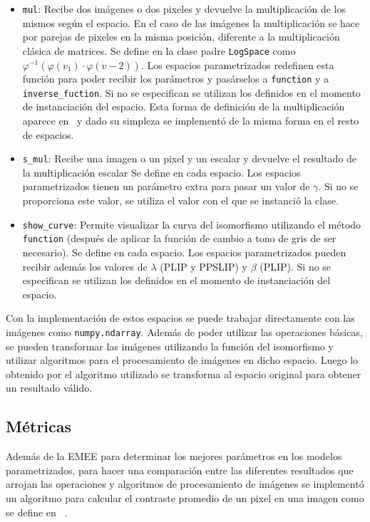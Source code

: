 \begin{itemize}
	\item \verb|mul|: Recibe dos im\'agenes o dos pixeles y devuelve la multiplicaci\'on de los mismos seg\'un el espacio. En el caso de las im\'agenes la multiplicaci\'on se hace por parejas de pixeles en la misma posici\'on, diferente a la multiplicaci\'on cl\'asica de matrices. Se define en la clase padre \verb|LogSpace| como $\varphi^{-1}(\varphi(v_1)\cdot\varphi(v-2))$. Los espacios parametrizados redefinen esta funci\'on para poder recibir los par\'ametros y pas\'arselos a \verb|function| y a \verb|inverse_fuction|. Si no se especifican se utilizan los definidos en el momento de instanciaci\'on del espacio. Esta forma de definici\'on de la multiplicaci\'on aparece en~\cite{panetta2010parameterized} y dado su simpleza se implement\'o de la misma forma en el resto de espacios.
	\item \verb|s_mul|: Recibe una imagen o un pixel y un escalar y devuelve el resultado de la multiplicaci\'on escalar Se define en cada espacio. Los espacios parametrizados tienen un par\'ametro extra para pasar un valor de $\gamma$. Si no se proporciona este valor, se utiliza el valor con el que se instanci\'o la clase.
	\item \verb|show_curve|: Permite visualizar la curva del isomorfismo utilizando el m\'etodo \verb|function| (despu\'es de aplicar la funci\'on de cambio a tono de gris de ser necesario). Se define en cada espacio. Los espacios parametrizados pueden recibir adem\'as los valores de $\lambda$ (PLIP y PPSLIP) y $\beta$ (PLIP). Si no se especifican se utilizan los definidos en el momento de instanciaci\'on del espacio.
\end{itemize}

Con la implementaci\'on de estos espacios se puede trabajar directamente con las im\'agenes como \verb|numpy.ndarray|. Adem\'as de poder utilizar las operaciones b\'asicas, se pueden transformar las im\'agenes utilizando la funci\'on del isomorfismo y utilizar algoritmos para el procesamiento de im\'agenes en dicho espacio. Luego lo obtenido por el algoritmo utilizado se transforma al espacio original para obtener un resultado v\'alido.

\subsection{M\'etricas}

Adem\'as de la EMEE para determinar los mejores par\'ametros en los modelos parametrizados, para hacer una comparaci\'on entre las diferentes resultados que arrojan las operaciones y algoritmos de procesamiento de im\'agenes se implement\'o un algoritmo para calcular el contraste promedio de un pixel en una imagen como se define en ~\cite{patrascu2014mathematical}.

